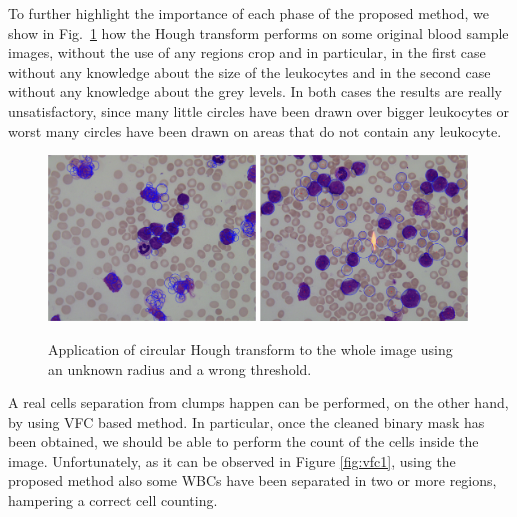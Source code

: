 \documentclass[final,a4paper,12pt,english]{UnicaPhdThesis3}
\begin{document}
To further highlight the importance of each phase of the proposed method, we show in Fig.~\ref{fig:ex10} how the Hough transform performs on some original blood sample images, without the use of any regions crop and in particular, in the first case without any knowledge about the size of the leukocytes and in the second case without any knowledge about the grey levels. In both cases the results are really unsatisfactory, since many little circles have been drawn over bigger leukocytes or worst many circles have been drawn on areas that do not contain any leukocyte. 
\begin{figure}[!t]
	\centering
	\includegraphics[width=0.49\textwidth]{images/2016_1_mva/wrongradius}
	\includegraphics[width=0.49\textwidth]{images/2016_1_mva/wrongthreshold}
	\caption{\label{fig:ex10}Application of circular Hough transform to the whole image using an unknown radius and a wrong threshold.}
\end{figure}

A real cells separation from clumps happen can be performed, on the other hand, by using VFC based method. 
In particular, once the cleaned binary mask has been obtained, we should be able to perform the count of the cells inside the image. Unfortunately, as it can be observed in Figure \ref{fig:vfc1}, using the proposed method also some WBCs have been separated in two or more regions, hampering a correct cell counting.
\end{document}
